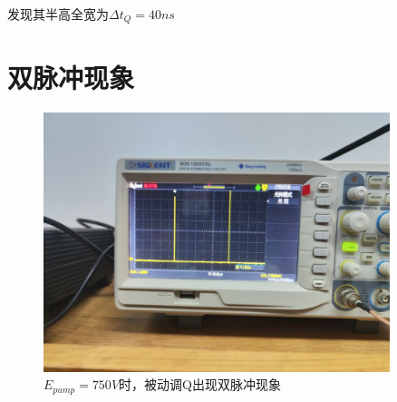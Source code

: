 \documentclass[a4paper,UTF8]{ctexart}
\begin{document}
发现其半高全宽为$\Delta t_{Q} = 40 ns$

\section{双脉冲现象}

\begin{figure}[H]
    \centering
    \begin{minipage}[b]{0.9\textwidth}
        \centering
        \includegraphics[width=0.9\textwidth]{./ffig6.jpg}
        \caption{$E_{pump} = 750V$时，被动调Q出现双脉冲现象}
    \end{minipage}
\end{figure}
\end{document}
